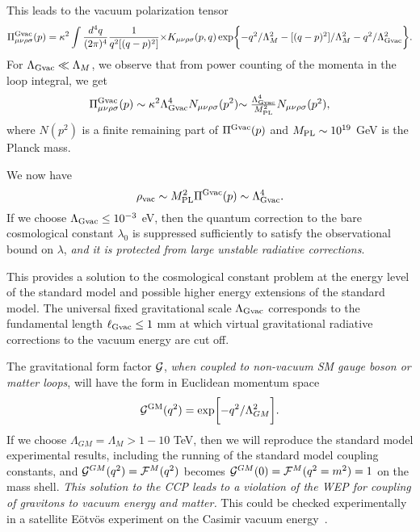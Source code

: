 \documentclass[a4paper,12pt]{article}
\begin{document}
This leads to the vacuum polarization tensor
\begin{equation}
\label{Ptensor}
\Pi^{\rm Gvac}_{\mu\nu\rho\sigma}(p)=\kappa^2
\int\frac{d^4q}{(2\pi)^4}\frac{1}{q^2[(q-p)^2]}
$$ $$
\times K_{\mu\nu\rho\sigma}(p,q)
\exp\biggl\{-q^2/\Lambda^2_M
-[(q-p)^2]/\Lambda^2_M-q^2/\Lambda^2_{{\rm Gvac}}\biggr\}.
\end{equation}
For $\Lambda_{{\rm Gvac}} \ll \Lambda_M$, we
observe that from power counting of the momenta in the loop integral, we
get
\begin{equation}
\Pi^{\rm {\rm Gvac}}_{\mu\nu\rho\sigma}(p)\sim
\kappa^2\Lambda_{{\rm Gvac}}^4N_{\mu\nu\rho\sigma}(p^2)
$$ $$
\sim\frac{\Lambda_{{\rm Gvac}}^4}{M^2_{\rm PL}}N_{\mu\nu\rho\sigma}(p^2),
\end{equation}
where $N(p^2)$ is a finite remaining part of $\Pi^{\rm {\rm Gvac}}(p)$ and
$M_{\rm PL}\sim 10^{19}$ GeV is the Planck mass.

We now have
\begin{equation}
\rho_{\rm vac}\sim M^2_{\rm PL}\Pi^{\rm {\rm Gvac}}(p)\sim\Lambda_{{\rm
Gvac}}^4.
\end{equation} If we choose $\Lambda_{{\rm Gvac}}\leq 10^{-3}$
eV, then the quantum correction to the bare cosmological constant
$\lambda_0$ is suppressed sufficiently to satisfy the observational bound
on $\lambda$, {\it and it is protected from large unstable radiative
corrections}.

This provides a solution to the
cosmological constant problem at the energy level of the standard model
and possible higher energy extensions of the standard model. The universal
fixed gravitational scale $\Lambda_{{\rm Gvac}}$ corresponds to the fundamental
length $\ell_{{\rm Gvac}}\leq 1$ mm at which virtual gravitational radiative
corrections to the vacuum energy are cut off.

The gravitational form factor ${\cal G}$, {\it when
coupled to non-vacuum SM gauge boson or matter loops}, will have the form
in Euclidean momentum space
\begin{equation} {\cal G}^{\rm GM}(q^2)
=\exp\biggl[-q^2/\Lambda_{GM}^2\biggr].
\end{equation}
If we choose $\Lambda_{GM} = \Lambda_{M}> 1-10$ TeV, then we will
reproduce the standard model experimental results, including the running
of the standard model coupling constants, and ${\cal G}^{GM}(q^2)={\cal
F}^M(q^2)$ becomes ${\cal G}^{GM}(0)={\cal F}^M(q^2=m^2)=1$ on the mass
shell. {\it This solution to the CCP leads to a violation of the WEP for
coupling of gravitons to vacuum energy and matter.} This
could be checked experimentally in a satellite E\"otv\"os experiment on the
Casimir vacuum energy~\cite{Ross}.
\end{document}
